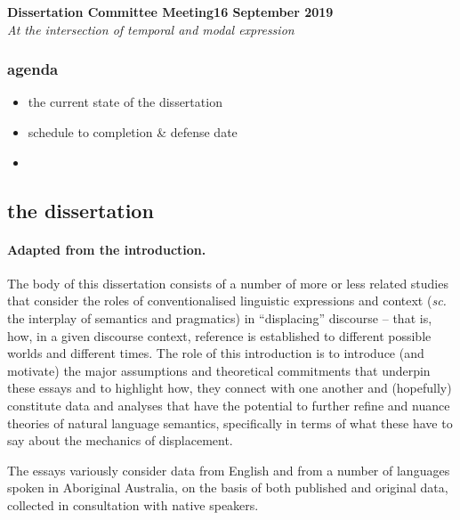 \documentclass[11pt,dvipsnames]{article}
\begin{document}
\noindent\textbf{{Dissertation Committee Meeting}\hfill 16 September 2019}\\
\textit{At the intersection of temporal and modal expression}\\


\subsubsection*{agenda}
\begin{itemize}

	\item the current state of the dissertation
	\item schedule to completion \& defense date
	\item 	
\end{itemize}


\subsection*{the dissertation}

\paragraph{Adapted from the introduction.}  
The body of this dissertation consists of a number of more or less related studies that consider the roles of conventionalised linguistic expressions and context (\textit{sc.} the interplay of semantics and pragmatics) in ``displacing'' discourse -- that is, how, in a given discourse context, reference is established to different possible worlds and different times. The role of this introduction is to introduce (and motivate) the major assumptions and theoretical commitments that underpin these essays and to highlight how, they connect with one another and (hopefully) constitute data and analyses that have the potential to further refine and nuance theories of natural language semantics, specifically in terms of what these have to say about the mechanics of displacement.

The essays variously consider data from English and from a number of languages spoken in Aboriginal Australia, on the basis of both published and original data, collected in consultation with native speakers.%
\end{document}
